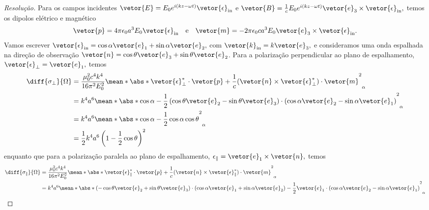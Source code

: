 \begin{proof}[Resolução]
   Para os campos incidentes \(\vetor{E} = E_0 e^{i(kz - \omega t)} \vetor{\epsilon}_\mathrm{in}\) e \(\vetor{B} = \frac{1}{c} E_0 e^{i(k z - \omega t)} \vetor{e}_3 \times \vetor{\epsilon}_{\mathrm{in}},\) temos os dipolos elétrico e magnético
   \begin{equation*}
      \vetor{p} = 4\pi \epsilon_0 a^3 E_0 \vetor{\epsilon}_{\mathrm{in}}\quad\text{e}\quad
      \vetor{m} = - 2\pi \epsilon_0 ca^3 E_0 \vetor{e}_3 \times \vetor{\epsilon}_\mathrm{in}.
   \end{equation*}
   Vamos escrever \(\vetor{\epsilon}_{\mathrm{in}} = \cos \alpha \vetor{e}_1 + \sin \alpha \vetor{e}_2,\) com \(\vetor{k}_{\mathrm{in}} = k \vetor{e}_3,\) e consideramos uma onda espalhada na direção de observação \(\vetor{n} = \cos\theta \vetor{e}_3 + \sin\theta \vetor{e}_2\). Para a polarização perpendicular ao plano de espalhamento, \(\vetor{\epsilon}_{\perp} = \vetor{e}_1,\) temos
   \begin{align*}
      \diff{\sigma_{\perp}}{\Omega} &= \frac{\mu_0^2 c^4 k^4}{16 \pi^2 E_0^2}\mean*{\abs*{\vetor{\epsilon}_{\perp}^* \cdot \vetor{p} + \frac1c (\vetor{n} \times \vetor{\epsilon}_{\perp}^*)\cdot \vetor{m}}^2}_{\alpha}\\
                                    &= k^4 a^6 \mean*{\abs*{\cos \alpha - \frac12 \left(\cos\theta \vetor{e}_2 - \sin\theta \vetor{e}_3\right)\cdot\left(\cos \alpha \vetor{e}_2 - \sin\alpha \vetor{e}_1\right)}^2}_\alpha\\
                                    &= k^4 a^6 \mean*{\abs*{\cos \alpha - \frac12 \cos \alpha \cos\theta}^2}_\alpha\\
                                    &= \frac12 k^4 a^6 \left(1 - \frac12 \cos\theta\right)^2
   \end{align*}
   enquanto que para a polarização paralela ao plano de espalhamento, \(\epsilon_{\parallel} = \vetor{e}_1 \times \vetor{n},\) temos
   \begin{align*}
      \diff{\sigma_{\parallel}}{\Omega} &= \frac{\mu_0^2 c^4 k^4}{16 \pi^2 E_0^2}\mean*{\abs*{\vetor{\epsilon}_{\parallel}^* \cdot \vetor{p} + \frac1c (\vetor{n} \times \vetor{\epsilon}_{\parallel}^*)\cdot \vetor{m}}^2}_{\alpha}\\
                                        &= k^4 a^6 \mean*{\abs*{(-\cos\theta \vetor{e}_2 + \sin\theta\vetor{e}_3) \cdot (\cos \alpha \vetor{e}_1 + \sin\alpha \vetor{e}_2) - \frac12 \vetor{e}_1\cdot (\cos \alpha \vetor{e}_2 - \sin\alpha \vetor{e}_1)}^2}_{\alpha}\\

\end{align*}
\end{proof}
